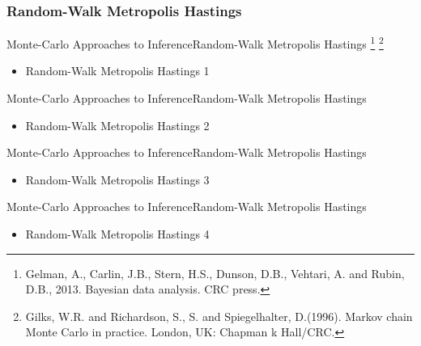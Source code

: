 \documentclass[AERbeamer%
              ,optEnglish%
              ,optBiber%
              ,optBibstyleAlphabetic%
              ,optBeamerClassicFormat%
              ]{AERlatex}%
\begin{document}
\subsubsection*{Random-Walk Metropolis Hastings}
\begin{frame}[c]{Monte-Carlo Approaches to Inference}{Random-Walk Metropolis Hastings \footnote{Gelman, A., Carlin, J.B., Stern, H.S., Dunson, D.B., Vehtari, A. and Rubin,
                                                                                                D.B., 2013. Bayesian data analysis. CRC press.}
                                                                                      \footnote{Gilks, W.R. and Richardson, S., S. and Spiegelhalter, D.(1996). Markov chain
                                                                                                Monte Carlo in practice. London, UK: Chapman k Hall/CRC.}}
    \centering
    \begin{itemize}
        \item Random-Walk Metropolis Hastings 1
    \end{itemize}
\end{frame}


\begin{frame}[c]{Monte-Carlo Approaches to Inference}{Random-Walk Metropolis Hastings}
    \centering
    \begin{itemize}
        \item Random-Walk Metropolis Hastings 2
    \end{itemize}
\end{frame}


\begin{frame}[c]{Monte-Carlo Approaches to Inference}{Random-Walk Metropolis Hastings}
    \centering
    \begin{itemize}
        \item Random-Walk Metropolis Hastings 3
    \end{itemize}
\end{frame}


\begin{frame}[c]{Monte-Carlo Approaches to Inference}{Random-Walk Metropolis Hastings}
    \centering
    \begin{itemize}
        \item Random-Walk Metropolis Hastings 4
    \end{itemize}
\end{frame}
\end{document}

